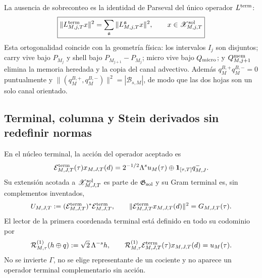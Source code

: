 La ausencia de sobreconteo es la identidad de Parseval del único operador
$L^{\rm term}$:
\begin{equation}\label{eq:pdf2-ns-six-loss-no-overcount}
 \boxed{\begin{gathered}
 \|L_{M,j,T}^{\rm term}x\|^2
 =\sum_{\mathfrak a}\|L_{M,j,T}^{\mathfrak a}x\|^2,
 \qquad x\in\mathscr X_{M,j,T}^{\rm sol}
 \end{gathered}}
\end{equation}
Esta ortogonalidad coincide con la geometría física: los intervalos $I_j$
son disjuntos; carry vive bajo $P_{M_j}$ y shell bajo
$P_{M_{j+1}}-P_{M_j}$; micro vive bajo $Q_{\rm micro}$; y
$Q^{\rm mem}_{M,j+1}$ elimina la memoria heredada y la copia del canal
advectivo. Además $q_M^{B,+}q_M^{B,-}=0$ puntualmente y
$\|(q_M^{B,+},q_M^{B,-})\|^2=|\mathscr B_{s,M}|$, de modo que las dos hojas
son un solo canal orientado.

\subsection{Terminal, columna y Stein derivados sin redefinir normas}

En el núcleo terminal, la acción del operador aceptado es
\begin{equation}\label{eq:pdf2-ns-terminal-action-on-core}
 \mathcal E_{M,J,T}^{\rm term}(\tau)x_{M,J,T}(d)
 =2^{-1/2}\Lambda^su_M(\tau)
 \oplus\mathbf1_{[\tau,T]}q^-_{M,J}.
\end{equation}
Su extensión acotada a $\mathscr X_{M,J,T}^{\rm sol}$ es parte de
$\mathfrak G_{\rm sol}$ y su Gram terminal es, sin complementos inventados,
\begin{equation}\label{eq:pdf2-ns-terminal-metric}
 U_{M,J,T}:=
 (\mathcal E_{M,J,T}^{\rm term})^*\mathcal E_{M,J,T}^{\rm term},
 \qquad
 \|\mathcal E_{M,J,T}^{\rm term}x_{M,J,T}(d)\|^2
 =G_{M,J,T}(\tau).
\end{equation}
El lector de la primera coordenada terminal está definido en todo su
codominio por
\begin{equation}\label{eq:pdf2-ns-terminal-reader}
 \mathcal R_{M,\tau}^{(1)}(h\oplus q):=
 \sqrt2\,\Lambda^{-s}h,
 \qquad
 \mathcal R_{M,\tau}^{(1)}
 \mathcal E_{M,J,T}^{\rm term}(\tau)x_{M,J,T}(d)=u_M(\tau).
\end{equation}
No se invierte $\Gamma$, no se elige representante de un cociente y no aparece
un operador terminal complementario sin acción.

